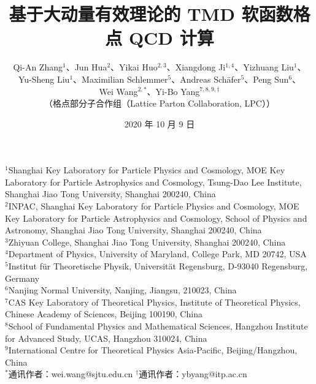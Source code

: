 \documentclass[11pt]{ctexart}
\begin{document}
\title{\bfseries 基于大动量有效理论的 TMD 软函数格点 QCD 计算}

\author{Qi-An Zhang$^{1}$、Jun Hua$^{2}$、Yikai Huo$^{2,3}$、Xiangdong Ji$^{1,4}$、Yizhuang Liu$^{1}$、\\
Yu-Sheng Liu$^{1}$、Maximilian Schlemmer$^{5}$、Andreas Sch\"afer$^{5}$、Peng Sun$^{6}$、\\
Wei Wang$^{2,\ast}$、Yi-Bo Yang$^{7,8,9,\dagger}$\\[6pt]
{\small （格点部分子合作组（Lattice Parton Collaboration, LPC））}}
\date{2020 年 10 月 9 日}

\maketitle

\begin{flushleft}
\begin{minipage}{0.92\textwidth}
{\small
$^{1}$Shanghai Key Laboratory for Particle Physics and Cosmology, MOE Key Laboratory for Particle Astrophysics and Cosmology, Tsung-Dao Lee Institute, Shanghai Jiao Tong University, Shanghai 200240, China\\
$^{2}$INPAC, Shanghai Key Laboratory for Particle Physics and Cosmology, MOE Key Laboratory for Particle Astrophysics and Cosmology, School of Physics and Astronomy, Shanghai Jiao Tong University, Shanghai 200240, China\\
$^{3}$Zhiyuan College, Shanghai Jiao Tong University, Shanghai 200240, China\\
$^{4}$Department of Physics, University of Maryland, College Park, MD 20742, USA\\
$^{5}$Institut f\"ur Theoretische Physik, Universit\"at Regensburg, D-93040 Regensburg, Germany\\
$^{6}$Nanjing Normal University, Nanjing, Jiangsu, 210023, China\\
$^{7}$CAS Key Laboratory of Theoretical Physics, Institute of Theoretical Physics, Chinese Academy of Sciences, Beijing 100190, China\\
$^{8}$School of Fundamental Physics and Mathematical Sciences, Hangzhou Institute for Advanced Study, UCAS, Hangzhou 310024, China\\
$^{9}$International Centre for Theoretical Physics Asia-Pacific, Beijing/Hangzhou, China\\
$^{\ast}$通讯作者：wei.wang@sjtu.edu.cn \quad
$^{\dagger}$通讯作者：ybyang@itp.ac.cn
}
\end{minipage}
\end{flushleft}
\end{document}
